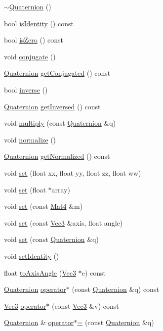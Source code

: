 \begin{DoxyCompactItemize}
\item 
\hyperlink{classQuaternion_a5f834c2ca469cd71edc8a23fdc3f56e8}{$\sim$\+Quaternion} ()
\item 
bool \hyperlink{classQuaternion_a64550e3147014607c42d40fc3bb7080b}{is\+Identity} () const
\item 
bool \hyperlink{classQuaternion_ab355dcc6194b9dcf4f303a1afec9f0b2}{is\+Zero} () const
\item 
void \hyperlink{classQuaternion_ae387bec8f394bdc58a5ac1480f11140f}{conjugate} ()
\item 
\hyperlink{classQuaternion}{Quaternion} \hyperlink{classQuaternion_a340e18206128073f5457258284386974}{get\+Conjugated} () const
\item 
bool \hyperlink{classQuaternion_aabe14be8bd8676241317449595cdcfff}{inverse} ()
\item 
\hyperlink{classQuaternion}{Quaternion} \hyperlink{classQuaternion_acab26dc0925530cf5d58c92e5fbb9e5a}{get\+Inversed} () const
\item 
void \hyperlink{classQuaternion_ad4acdaaea6f57183536015a0b0aec661}{multiply} (const \hyperlink{classQuaternion}{Quaternion} \&q)
\item 
void \hyperlink{classQuaternion_a48e6bafb249c895ed25f29dc9170e11e}{normalize} ()
\item 
\hyperlink{classQuaternion}{Quaternion} \hyperlink{classQuaternion_a203c9c6bf25dcd25bfc25fbe17ec4481}{get\+Normalized} () const
\item 
void \hyperlink{classQuaternion_a435e47a2efca1a6c39f1835678437104}{set} (float xx, float yy, float zz, float ww)
\item 
void \hyperlink{classQuaternion_aaf18a418dc62bf348e7629e4875da050}{set} (float $\ast$array)
\item 
void \hyperlink{classQuaternion_ae51fe27416ac31583a4442cc0b8b2252}{set} (const \hyperlink{classMat4}{Mat4} \&m)
\item 
void \hyperlink{classQuaternion_a27ac949226c34a565311aee0a10d61dc}{set} (const \hyperlink{classVec3}{Vec3} \&axis, float angle)
\item 
void \hyperlink{classQuaternion_aebd9c51e5ff6f3d0cc09e61350d33dd3}{set} (const \hyperlink{classQuaternion}{Quaternion} \&q)
\item 
void \hyperlink{classQuaternion_af180a480b5595be969233e728fc4563e}{set\+Identity} ()
\item 
float \hyperlink{classQuaternion_a122b18b294be2543bbc17cc1c7d8e25c}{to\+Axis\+Angle} (\hyperlink{classVec3}{Vec3} $\ast$e) const
\item 
\hyperlink{classQuaternion}{Quaternion} \hyperlink{classQuaternion_ab178e12364d87fb676d85695e491361f}{operator$\ast$} (const \hyperlink{classQuaternion}{Quaternion} \&q) const
\item 
\hyperlink{classVec3}{Vec3} \hyperlink{classQuaternion_a8b63a645c77ec58d1caa6ccb80f51c3b}{operator$\ast$} (const \hyperlink{classVec3}{Vec3} \&v) const
\item 
\hyperlink{classQuaternion}{Quaternion} \& \hyperlink{classQuaternion_ae897d8ee92c5ac1f7cfd534170eb521c}{operator$\ast$=} (const \hyperlink{classQuaternion}{Quaternion} \&q)
\end{DoxyCompactItemize}
